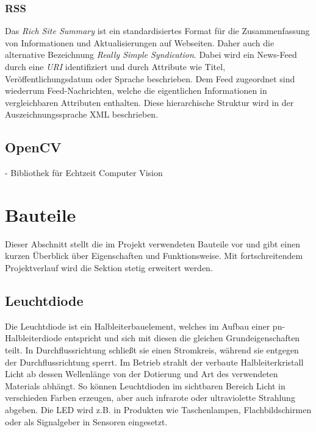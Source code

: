 \subsubsection{RSS}
\label{subsubsec:rss}

Das \textit{Rich Site Summary} ist ein standardisiertes Format für die Zusammenfassung von Informationen und Aktualisierungen auf Webseiten. Daher auch die alternative Bezeichnung \textit{Really Simple Syndication}. Dabei wird ein News-Feed durch eine \textit{URI} identifiziert und durch Attribute wie Titel, Veröffentlichungsdatum oder Sprache beschrieben. Dem Feed zugeordnet sind wiederrum Feed-Nachrichten, welche die eigentlichen Informationen in vergleichbaren Attributen enthalten. Diese hierarchische Struktur wird in der Auszeichnungssprache XML beschrieben.

\subsection{OpenCV}
\label{subsec:opencv}

- Bibliothek für Echtzeit Computer Vision



\section{Bauteile}
\label{cha:components}

Dieser Abschnitt stellt die im Projekt verwendeten Bauteile vor und gibt einen kurzen Überblick über Eigenschaften und Funktionsweise. Mit fortschreitendem Projektverlauf wird die Sektion stetig erweitert werden. 

\subsection{Leuchtdiode}

Die Leuchtdiode ist ein Halbleiterbauelement, welches im Aufbau einer pn-Halbleiterdiode entspricht und sich mit diesen die gleichen Grundeigenschaften teilt. In Durchflussrichtung schließt sie einen Stromkreis, während sie entgegen der Durchflussrichtung sperrt. Im Betrieb strahlt der verbaute Halbleiterkristall Licht ab dessen Wellenlänge von der Dotierung und Art des verwendeten Materials abhängt. So können Leuchtdioden im sichtbaren Bereich Licht in verschieden Farben erzeugen, aber auch infrarote oder ultraviolette Strahlung abgeben. Die LED wird z.B. in Produkten wie Taschenlampen, Flachbildschirmen oder als Signalgeber in Sensoren eingesetzt.

